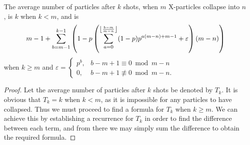 \begin{theorem}
  The average number of particles after $k$ shots, when $m$ X-particles collapse into $n$, is $k$ when $k < m$, and is 
  \begin{equation}
    m-1+\sum _{b=m-1}^{k-1} \left(1-p \left(\sum _{a=0}^{\floor*{\frac{b-m}{m-n}} } (1-p) p^{a (m-n)+m-1}+\varepsilon\right) (m-n)\right) \label{formula}
  \end{equation}
  when $k \ge m$ and $\varepsilon = \begin{cases} p^{b}, &b-m+1 \equiv 0 \bmod m-n \\ 0, &b-m+1 \not\equiv 0 \bmod m-n. \end{cases}$
\end{theorem}
\begin{proof}
  Let the average number of particles after $k$ shots be denoted by $T_k$. It is obvious that $T_k = k$ when $k < m$, as it is impossible for any particles to have collapsed. Thus we must proceed to find a formula for $T_k$ when $k \ge m$. We can achieve this by establishing a recurrence for $T_k$ in order to find the difference between each term, and from there we may simply sum the difference to obtain the required formula. 


\end{proof}
